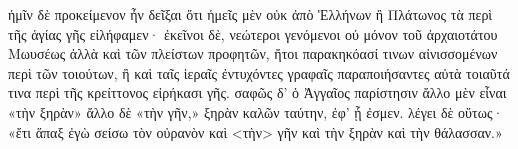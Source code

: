 \begin{greek}
ἡμῖν δὲ προκείμενον ἦν δεῖξαι ὅτι ἡμεῖς μὲν οὐκ ἀπὸ Ἑλλήνων ἢ Πλάτωνος τὰ περὶ τῆς ἁγίας γῆς εἰλήφαμεν· ἐκεῖνοι δὲ, νεώτεροι γενόμενοι οὐ μόνον τοῦ ἀρχαιοτάτου Μωυσέως ἀλλὰ καὶ τῶν πλείστων προφητῶν, ἤτοι παρακηκόασί τινων αἰνισσομένων περὶ τῶν τοιούτων, ἢ καὶ ταῖς ἱεραῖς ἐντυχόντες γραφαῖς παραποιήσαντες αὐτὰ τοιαῦτά τινα περὶ τῆς κρείττονος εἰρήκασι γῆς. σαφῶς δ' ὁ Ἀγγαῖος παρίστησιν ἄλλο μὲν εἶναι «τὴν ξηρὰν» ἄλλο δὲ «τὴν γῆν,» ξηρὰν καλῶν ταύτην, ἐφ' ᾗ ἐσμεν. λέγει δὲ οὕτως· «ἔτι ἅπαξ ἐγὼ σείσω τὸν οὐρανὸν καὶ <τὴν> γῆν καὶ τὴν ξηρὰν καὶ τὴν θάλασσαν.»

\end{greek}